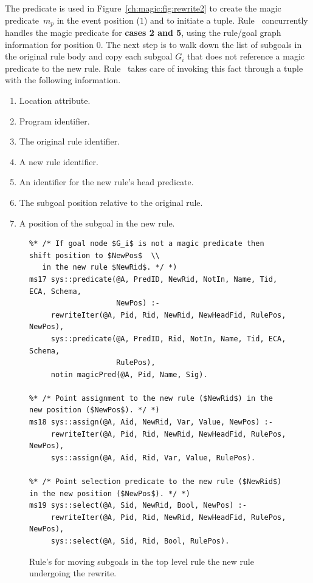 The  predicate is used in Figure~\ref{ch:magic:fig:rewrite2} to
create the magic predicate~$m_p$ in the event position ($1$) and to initiate a
 tuple.  Rule~ concurrently handles the magic
predicate for {\bf cases 2 and 5}, using the rule/goal graph information for 
position $0$.  The next step is to walk down the list of subgoals in the
original rule body and copy each subgoal $G_{i}$ that does not reference a
magic predicate to the new rule.  Rule~ takes care of
invoking this fact through a  tuple with the following information.  
\begin{enumerate} 
  \ssp
  \item Location attribute.  
  \item Program identifier.
  \item The original rule identifier.
  \item A new rule identifier.
  \item An identifier for the new rule's head predicate.
  \item The subgoal position relative to the original rule.
  \item A position of the subgoal in the new rule.
\end{enumerate}

\begin{figure}[!t]
\ssp
\centering
\begin{lstlisting}
%* /* If goal node $G_i$ is not a magic predicate then shift position to $NewPos$  \\
   in the new rule $NewRid$. */ *)
ms17 sys::predicate(@A, PredID, NewRid, NotIn, Name, Tid, ECA, Schema,
                    NewPos) :-
     rewriteIter(@A, Pid, Rid, NewRid, NewHeadFid, RulePos, NewPos), 
     sys::predicate(@A, PredID, Rid, NotIn, Name, Tid, ECA, Schema, 
                    RulePos), 
     notin magicPred(@A, Pid, Name, Sig). 
	
%* /* Point assignment to the new rule ($NewRid$) in the new position ($NewPos$). */ *)
ms18 sys::assign(@A, Aid, NewRid, Var, Value, NewPos) :-
     rewriteIter(@A, Pid, Rid, NewRid, NewHeadFid, RulePos, NewPos),
     sys::assign(@A, Aid, Rid, Var, Value, RulePos).
	
%* /* Point selection predicate to the new rule ($NewRid$) in the new position ($NewPos$). */ *)
ms19 sys::select(@A, Sid, NewRid, Bool, NewPos) :-
     rewriteIter(@A, Pid, Rid, NewRid, NewHeadFid, RulePos, NewPos),
     sys::select(@A, Sid, Rid, Bool, RulePos).
\end{lstlisting}
\caption{\label{ch:magic:fig:rewrite3} Rule's for moving subgoals in the top level rule
the new rule undergoing the rewrite. }
\end{figure}

